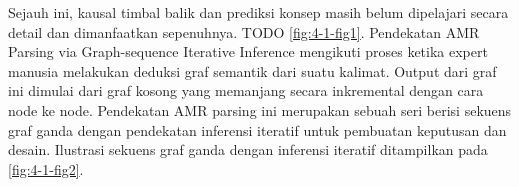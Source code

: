 Sejauh ini, kausal timbal balik dan prediksi konsep masih belum dipelajari secara detail dan dimanfaatkan sepenuhnya.
TODO \cref{fig:4-1-fig1}.
Pendekatan AMR Parsing via Graph-sequence Iterative Inference mengikuti proses ketika expert manusia melakukan deduksi graf semantik dari suatu kalimat.
Output dari graf ini dimulai dari graf kosong yang memanjang secara inkremental dengan cara node ke node.
Pendekatan AMR parsing ini merupakan sebuah seri berisi sekuens graf ganda dengan pendekatan inferensi iteratif untuk pembuatan keputusan dan desain.
Ilustrasi sekuens graf ganda dengan inferensi iteratif ditampilkan pada \cref{fig:4-1-fig2}.

